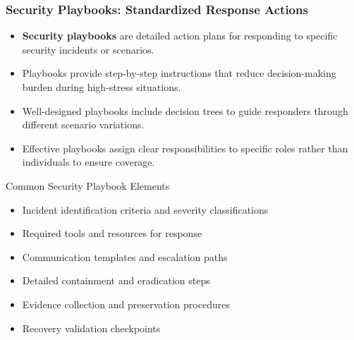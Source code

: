 \documentclass{beamer}
\begin{document}
\begin{frame}
\frametitle{Security Playbooks: Standardized Response Actions}
\begin{itemize}
\item \textbf{Security playbooks} are detailed action plans for responding to specific security incidents or scenarios.
\item Playbooks provide step-by-step instructions that reduce decision-making burden during high-stress situations.
\item Well-designed playbooks include decision trees to guide responders through different scenario variations.
\item Effective playbooks assign clear responsibilities to specific roles rather than individuals to ensure coverage.
\end{itemize}

\begin{block}{Common Security Playbook Elements}
\scriptsize
\begin{itemize}
\item Incident identification criteria and severity classifications
\item Required tools and resources for response
\item Communication templates and escalation paths
\item Detailed containment and eradication steps
\item Evidence collection and preservation procedures
\item Recovery validation checkpoints
\end{itemize}
\end{block}
\end{frame}
\end{document}

